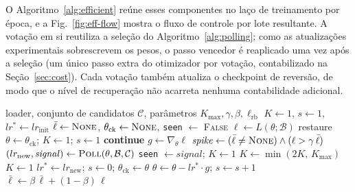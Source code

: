 \documentclass[conference]{IEEEtran}
\begin{document}
O Algoritmo~\ref{alg:efficient} reúne esses componentes no laço de treinamento por época, e a Fig.~\ref{fig:eff-flow} mostra o fluxo de controle por lote resultante. A votação em si reutiliza a seleção do Algoritmo~\ref{alg:polling}; como as atualizações experimentais sobrescrevem os pesos, o passo vencedor é reaplicado uma vez após a seleção (um único passo extra do otimizador por votação, contabilizado na Seção~\ref{sec:cost}). Cada votação também atualiza o checkpoint de reversão, de modo que o nível de recuperação não acarreta nenhuma contabilidade adicional.

\begin{algorithm}[htbp]
\caption{Votação Eficiente (uma época)}
\label{alg:efficient}
\begin{algorithmic}[1]
\REQUIRE loader, conjunto de candidatos $\mathcal{C}$, parâmetros $K_{\max}, \gamma, \beta, \ell_{\mathrm{rb}}$
\STATE $K \leftarrow 1$,\; $s \leftarrow 1$,\; $lr^{*} \leftarrow lr_{\mathrm{init}}$ 
\STATE $\bar{\ell} \leftarrow \textsc{None}$,\; $\theta_{\mathrm{ck}} \leftarrow \textsc{None}$,\; \texttt{seen} $\leftarrow$ \textsc{False}
    \STATE $\ell \leftarrow L(\theta; \mathcal{B})$
        \STATE restaure $\theta \leftarrow \theta_{\mathrm{ck}}$;\; $K \leftarrow 1$;\; $s \leftarrow 1$ 
        \STATE \textbf{continue}
    \ENDIF
    \STATE $g \leftarrow \nabla_\theta \ell$
    \STATE $\mathit{spike} \leftarrow (\bar{\ell} \neq \textsc{None}) \wedge (\ell > \gamma\,\bar{\ell})$ 
        \STATE $(lr_{\mathrm{new}}, \mathit{signal}) \leftarrow \textsc{Poll}(\theta, \mathcal{B}, \mathcal{C})$
            \STATE \texttt{seen} $\leftarrow \mathit{signal}$;\; $K \leftarrow 1$
            \STATE $K \leftarrow \min(2K,\, K_{\max})$ 
        \ELSE
            \STATE $K \leftarrow 1$ 
        \ENDIF
        \STATE $lr^{*} \leftarrow lr_{\mathrm{new}}$;\; $s \leftarrow 0$;\; $\theta_{\mathrm{ck}} \leftarrow \theta$ 
    \ELSE
        \STATE $\theta \leftarrow \theta - lr^{*} \cdot g$;\; $s \leftarrow s + 1$ 
    \ENDIF
    \STATE $\bar{\ell} \leftarrow \beta\,\bar{\ell} + (1-\beta)\,\ell$ 
\ENDFOR
\end{algorithmic}
\end{algorithm}
\end{document}
